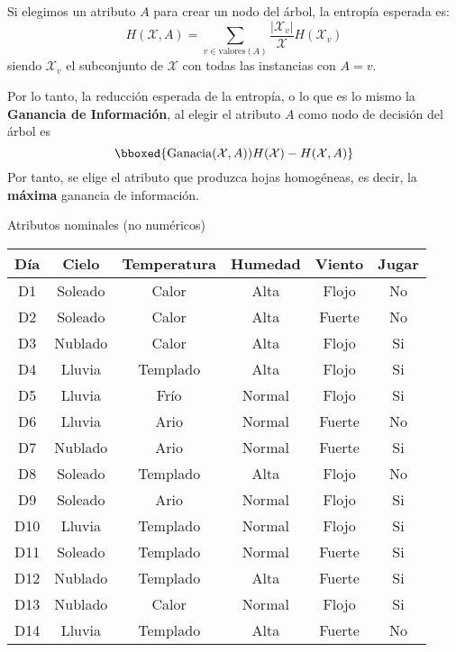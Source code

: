 Si elegimos un atributo $A$ para crear un nodo del árbol, la entropía esperada es: \[ H(\mathcal{X},A)=\sum_{v\in\mathrm{valores}(A)}\dfrac{|\mathcal{X}_v|}{\mathcal{X}}H(\mathcal{X}_v) \]siendo $\mathcal{X}_v$ el subconjunto de $\mathcal{X}$ con todas las instancias con $A=v$.

Por lo tanto, la reducción esperada de la entropía, o lo que es lo mismo la \textbf{Ganancia de Información}, al elegir el atributo $A$ como nodo de decisión del árbol es \[ \bboxed{\mathrm{Ganacia}(\mathcal{X},A))H(\mathcal{X})-H(\mathcal{X},A)} \]
Por tanto, se elige el atributo que produzca hojas homogéneas, es decir, la \textbf{máxima} ganancia de información.

\Ej

Atributos nominales (no numéricos)

\begin{center}
	\begin{tabular}{|cccccc|}
		\hline
		\rowcolor[HTML]{A5FFC4} 
		\hline
		Día & Cielo & Temperatura & Humedad & Viento & \cellcolor[HTML]{FF8787}Jugar \\ \hline
		\rowcolor[HTML]{34CDF9} 
		\hline
		{\color[HTML]{333333} D1} & {\color[HTML]{333333} Soleado} & {\color[HTML]{333333} Calor} & {\color[HTML]{333333} Alta} & {\color[HTML]{333333} Flojo} & \cellcolor[HTML]{FF8787}No \\
		\rowcolor[HTML]{007AFF} 
		D2 & Soleado & Calor & Alta & Fuerte & \cellcolor[HTML]{FC5D5D}No \\
		\rowcolor[HTML]{34CDF9} 
		D3 & Nublado & Calor & Alta & Flojo & \cellcolor[HTML]{FF8787}Si \\
		\rowcolor[HTML]{007AFF} 
		D4 & Lluvia & Templado & Alta & Flojo & \cellcolor[HTML]{FC5D5D}Si \\
		\rowcolor[HTML]{34CDF9} 
		D5 & Lluvia & Frío & Normal & Flojo & \cellcolor[HTML]{FF8787}Si \\
		\rowcolor[HTML]{007AFF} 
		D6 & Lluvia & Ario & Normal & Fuerte & \cellcolor[HTML]{FC5D5D}No \\
		\rowcolor[HTML]{34CDF9} 
		D7 & Nublado & Ario & Normal & Fuerte & \cellcolor[HTML]{FF8787}Si \\
		\rowcolor[HTML]{007AFF} 
		D8 & Soleado & Templado & Alta & Flojo & \cellcolor[HTML]{FC5D5D}No \\
		\rowcolor[HTML]{34CDF9} 
		D9 & Soleado & Ario & Normal & Flojo & \cellcolor[HTML]{FF8787}Si \\
		\rowcolor[HTML]{007AFF} 
		D10 & Lluvia & Templado & Normal & Flojo & \cellcolor[HTML]{FC5D5D}Si \\
		\rowcolor[HTML]{34CDF9} 
		D11 & Soleado & Templado & Normal & Fuerte & \cellcolor[HTML]{FF8787}Si \\
		\rowcolor[HTML]{007AFF} 
		D12 & Nublado & Templado & Alta & Fuerte & \cellcolor[HTML]{FC5D5D}Si \\
		\rowcolor[HTML]{34CDF9} 
		D13 & Nublado & Calor & Normal & Flojo & \cellcolor[HTML]{FF8787}Si \\
		\rowcolor[HTML]{007AFF} 
		D14 & Lluvia & Templado & Alta & Fuerte & \cellcolor[HTML]{FC5D5D}No \\ \hline
	\end{tabular}
\end{center}
